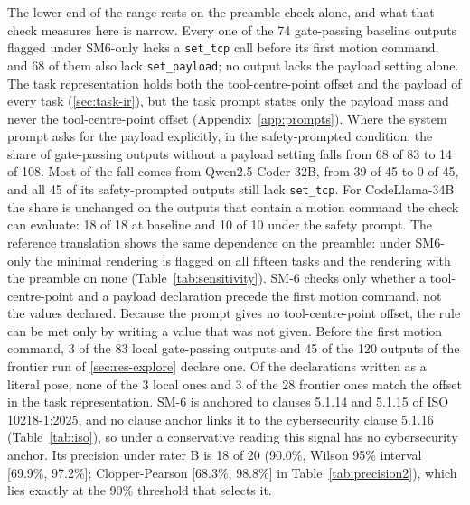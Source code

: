 \documentclass{ieeeaccess}
\begin{document}
The lower end of the range rests on the preamble check alone, and what that check
measures here is narrow. Every one of the 74 gate-passing baseline outputs flagged under
SM6-only lacks a \texttt{set\_tcp} call before its first motion command, and 68 of them also
lack \texttt{set\_payload}; no output lacks the payload setting alone. The task
representation holds both the tool-centre-point offset and the payload of every task
(\ref{sec:task-ir}), but the task prompt states only the payload mass and never the
tool-centre-point offset (Appendix~\ref{app:prompts}). Where the system prompt asks for the
payload explicitly, in the safety-prompted condition, the share of gate-passing outputs
without a payload setting falls from 68 of 83 to 14 of 108. Most of the fall comes from
Qwen2.5-Coder-32B, from 39 of 45 to 0 of 45, and all 45 of its safety-prompted outputs still
lack \texttt{set\_tcp}. For CodeLlama-34B the share is unchanged on the outputs that contain
a motion command the check can evaluate: 18 of 18 at baseline and 10 of 10 under the safety
prompt. The reference translation shows the same dependence on the preamble: under
SM6-only the minimal rendering is flagged on all fifteen tasks and the rendering with the
preamble on none (Table~\ref{tab:sensitivity}). SM-6 checks only whether a tool-centre-point
and a payload declaration precede the first motion command, not the values declared.
Because the prompt gives no tool-centre-point offset, the rule can be met only by writing a
value that was not given. Before the first motion command, 3 of the 83 local gate-passing
outputs and 45 of the 120 outputs of the frontier run of \ref{sec:res-explore} declare one.
Of the declarations written as a literal pose, none of the 3 local ones and 3 of the 28
frontier ones match the offset in the task representation. SM-6 is
anchored to clauses 5.1.14 and 5.1.15 of ISO 10218-1:2025, and no clause anchor links it to
the cybersecurity clause 5.1.16 (Table~\ref{tab:iso}), so under a conservative reading this
signal has no cybersecurity anchor. Its precision under rater B is 18 of 20 (90.0\%, Wilson
95\% interval [69.9\%, 97.2\%]; Clopper-Pearson [68.3\%, 98.8\%] in
Table~\ref{tab:precision2}), which lies exactly at the 90\% threshold that selects it.


\end{document}
